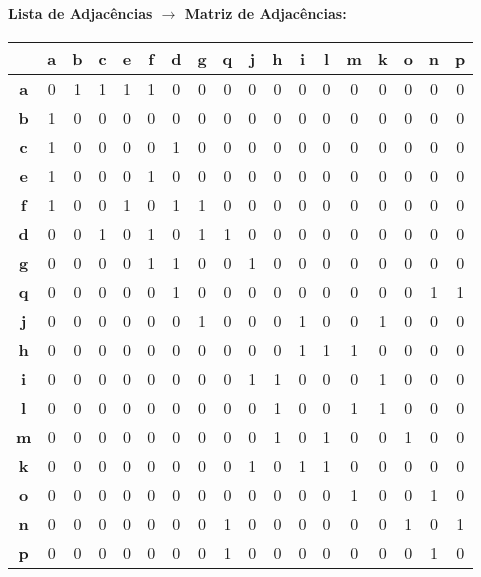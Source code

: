 \documentclass[a4paper,12pt]{article}
\begin{document}
\paragraph*{Lista de Adjacências $\rightarrow$ Matriz de Adjacências:}
\begin{center}
\tiny
\begin{tabular*}{\textwidth}{c|@{\extracolsep{\fill}}ccccccccccccccccc}
\rowcolor[gray]{0.9}
 & \textbf{a} & \textbf{b} & \textbf{c} & \textbf{e} & \textbf{f} & \textbf{d} & \textbf{g} & \textbf{q} & \textbf{j} & \textbf{h} & \textbf{i} & \textbf{l} & \textbf{m} & \textbf{k} & \textbf{o} & \textbf{n} & \textbf{p} \\ \hline
\textbf{a} & 0&1&1&1&1&0&0&0&0&0&0&0&0&0&0&0&0 \\ \textbf{b} & 1&0&0&0&0&0&0&0&0&0&0&0&0&0&0&0&0 \\
\textbf{c} & 1&0&0&0&0&1&0&0&0&0&0&0&0&0&0&0&0 \\ \textbf{e} & 1&0&0&0&1&0&0&0&0&0&0&0&0&0&0&0&0 \\
\textbf{f} & 1&0&0&1&0&1&1&0&0&0&0&0&0&0&0&0&0 \\ \textbf{d} & 0&0&1&0&1&0&1&1&0&0&0&0&0&0&0&0&0 \\
\textbf{g} & 0&0&0&0&1&1&0&0&1&0&0&0&0&0&0&0&0 \\ \textbf{q} & 0&0&0&0&0&1&0&0&0&0&0&0&0&0&0&1&1 \\
\textbf{j} & 0&0&0&0&0&0&1&0&0&0&1&0&0&1&0&0&0 \\ \textbf{h} & 0&0&0&0&0&0&0&0&0&0&1&1&1&0&0&0&0 \\
\textbf{i} & 0&0&0&0&0&0&0&0&1&1&0&0&0&1&0&0&0 \\ \textbf{l} & 0&0&0&0&0&0&0&0&0&1&0&0&1&1&0&0&0 \\
\textbf{m} & 0&0&0&0&0&0&0&0&0&1&0&1&0&0&1&0&0 \\ \textbf{k} & 0&0&0&0&0&0&0&0&1&0&1&1&0&0&0&0&0 \\
\textbf{o} & 0&0&0&0&0&0&0&0&0&0&0&0&1&0&0&1&0 \\ \textbf{n} & 0&0&0&0&0&0&0&1&0&0&0&0&0&0&1&0&1 \\
\textbf{p} & 0&0&0&0&0&0&0&1&0&0&0&0&0&0&0&1&0 \\
\end{tabular*}
\end{center}
\end{document}
